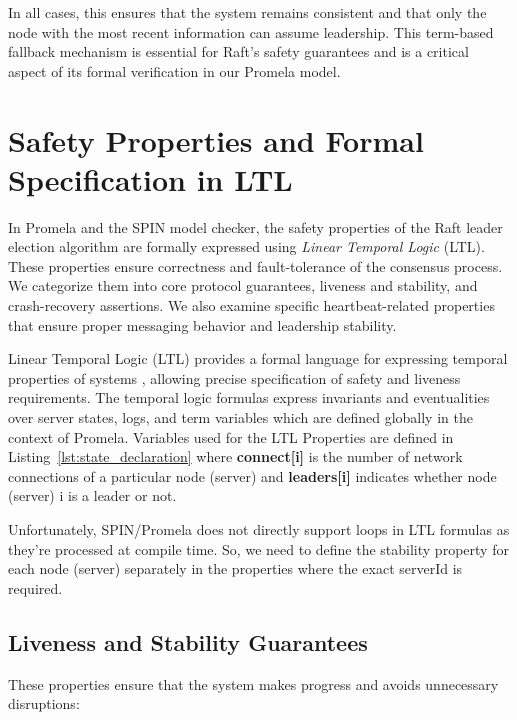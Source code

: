 \documentclass[a4paper]{llncs}
\begin{document}
In all cases, this ensures that the system remains consistent and that only the node with the most recent information can assume leadership. This term-based fallback mechanism is essential for Raft's safety guarantees and is a critical aspect of its formal verification in our Promela model.
\section{Safety Properties and Formal Specification in LTL}
\label{sec:safety_properties}

In Promela and the SPIN model checker, the safety properties of the Raft leader election algorithm are formally expressed using \textit{Linear Temporal Logic} (LTL). These properties ensure correctness and fault-tolerance of the consensus process. We categorize them into core protocol guarantees, liveness and stability, and crash-recovery assertions. We also examine specific heartbeat-related properties that ensure proper messaging behavior and leadership stability.

Linear Temporal Logic (LTL) provides a formal language for expressing temporal properties of systems \cite{Pnueli}, allowing precise specification of safety and liveness requirements. The temporal logic formulas express invariants and eventualities over server states, logs, and term variables which are defined globally in the context of Promela.
Variables used for the LTL Properties are defined in Listing~\ref{lst:state_declaration} where \textbf{connect[i]} is the number of network connections of a particular node (server) and \textbf{leaders[i]} indicates whether node (server) i is a leader or not.

Unfortunately, SPIN/Promela does not directly support loops in LTL formulas as they're processed at compile time. So, we need to define the stability property for each node (server) separately in the properties where the exact serverId is required.

\subsection{Liveness and Stability Guarantees}

These properties ensure that the system makes progress and avoids unnecessary disruptions:
\end{document}
